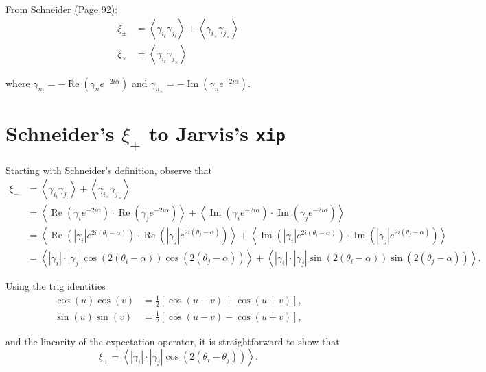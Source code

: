 \documentclass[%
 reprint,
 amsmath,amssymb,
 aps,nofootinbib
]{revtex4-1}
\begin{document}
From Schneider \href{http://arxiv.org/pdf/astro-ph/0509252v1.pdf}{(Page 92)}:
\begin{align}
\xi_\pm&=\left<\gamma_{i_t}\gamma_{j_t}\right>\pm\left<\gamma_{i_\times}\gamma_{j_\times}\right>\label{s+-}\\
\xi_\times&=\left<\gamma_{i_t}\gamma_{j_\times}\right>\label{sx}
\end{align}

where $\gamma_{n_t}=-\operatorname{Re}\left(\gamma_n e^{-2i\alpha}\right)$ and $\gamma_{n_\times}=-\operatorname{Im}\left(\gamma_n e^{-2i\alpha}\right)$.\\

\section*{Schneider's $\xi_+$ to Jarvis's \texttt{xip}}

Starting with Schneider's definition, observe that
\begin{align*}
\xi_+&=\left<\gamma_{i_t}\gamma_{j_t}\right>+\left<\gamma_{i_\times}\gamma_{j_\times}\right>\\
&=\left<\operatorname{Re}\left(\gamma_ie^{-2i\alpha}\right)\cdot\operatorname{Re}\left(\gamma_je^{-2i\alpha}\right)\right>+\left<\operatorname{Im}\left(\gamma_ie^{-2i\alpha}\right)\cdot\operatorname{Im}\left(\gamma_je^{-2i\alpha}\right)\right>\\
&=\left<\operatorname{Re}\left(|\gamma_i|e^{2i(\theta_i-\alpha)}\right)\cdot\operatorname{Re}\left(|\gamma_j|e^{2i(\theta_j-\alpha)}\right)\right>+\left<\operatorname{Im}\left(|\gamma_i|e^{2i(\theta_i-\alpha)}\right)\cdot\operatorname{Im}\left(|\gamma_j|e^{2i(\theta_j-\alpha)}\right)\right>\\
&=\left<|\gamma_i|\cdot|\gamma_j|\cos\left(2(\theta_i-\alpha)\right)\cos\left(2(\theta_j-\alpha)\right)\right>+\left<|\gamma_i|\cdot|\gamma_j|\sin\left(2(\theta_i-\alpha)\right)\sin\left(2(\theta_j-\alpha)\right)\right>.
\end{align*}

Using the trig identities
\begin{align}
\cos(u)\cos(v)&=\frac{1}{2}\left[\cos(u-v)+\cos(u+v)\right],\\
\sin(u)\sin(v)&=\frac{1}{2}\left[\cos(u-v)-\cos(u+v)\right],
\end{align}

and the linearity of the expectation operator, it is straightforward to show that
$$\xi_+=\left<|\gamma_i|\cdot|\gamma_j|\cos\left(2(\theta_i-\theta_j)\right)\right>.$$
\end{document}
